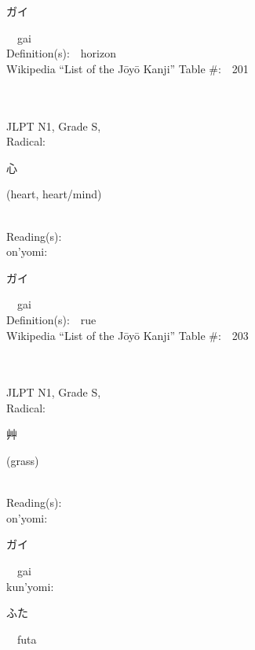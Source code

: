 \begin{multicols}{2}
{\hspace*{2em}}{\begin{CJK}{UTF8}{min} ガイ \end{CJK}}\ \ gai\ \ \\
Definition(s):\ \ horizon \\
Wikipedia ``List of the J\=oy\=o Kanji'' Table \#:\ \ 201 \\
\ \ \\
{\fontsize{34pt}{40pt}  }\ \ \\
{JLPT N1, Grade S, \\Radical:\ \ {\begin{CJK}{UTF8}{min} 心 \end{CJK}} (heart, heart/mind) } \\
Reading(s):\ \ \\
{\hspace*{1em}}on'yomi:\ \ \\
{\hspace*{2em}}{\begin{CJK}{UTF8}{min} ガイ \end{CJK}}\ \ gai\ \ \\
Definition(s):\ \ rue \\
Wikipedia ``List of the J\=oy\=o Kanji'' Table \#:\ \ 203 \\
\ \ \\
{\fontsize{34pt}{40pt}  }\ \ \\
{JLPT N1, Grade S, \\Radical:\ \ {\begin{CJK}{UTF8}{min} 艸 \end{CJK}} (grass) } \\
Reading(s):\ \ \\
{\hspace*{1em}}on'yomi:\ \ \\
{\hspace*{2em}}{\begin{CJK}{UTF8}{min} ガイ \end{CJK}}\ \ gai\ \ \\
{\hspace*{1em}}kun'yomi:\ \ \\
{\hspace*{2em}}{\begin{CJK}{UTF8}{min} ふた \end{CJK}}\ \ futa\ \ \\

\end{multicols}
